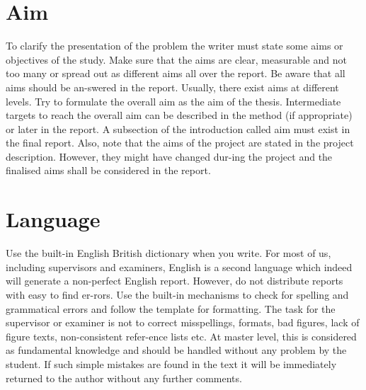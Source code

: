 \section{Aim}
To clarify the presentation of the problem the writer must state some aims or objectives of the study. Make sure that the aims are clear, measurable and not too many or spread out as different aims all over the report.  Be aware that all aims should be an-swered in the report. Usually, there exist aims at different levels. Try to formulate the overall aim as the aim of the thesis. Intermediate targets to reach the overall aim can be described in the method (if appropriate) or later in the report. A subsection of the introduction called aim must exist in the final report. Also, note that the aims of the project are stated in the project description. However, they might have changed dur-ing the project and the finalised aims shall be considered in the report. 

\begin{comment}
To write notes or comments that isn't published in the pdf.
\end{comment}

\section{Language}
Use the built-in English British dictionary when you write. For most of us, including supervisors and examiners, English is a second language which indeed will generate a non-perfect English report. However, do not distribute reports with easy to find er-rors. Use the built-in mechanisms to check for spelling and grammatical errors and follow the template for formatting. The task for the supervisor or examiner is not to correct misspellings, formats, bad figures, lack of figure texts, non-consistent refer-ence lists etc. At master level, this is considered as fundamental knowledge and should be handled without any problem by the student. If such simple mistakes are found in the text it will be immediately returned to the author without any further comments. 

\begin{comment}
To write notes or comments that isn't published in the pdf.
\end{comment}

